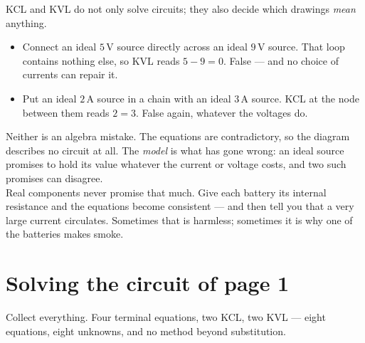 \documentclass[11pt,a4paper]{article}
\newcommand{\uni}[1]{\,\mathrm{#1}}
\newcommand{\A}{\uni{A}}   \newcommand{\V}{\uni{V}}
\begin{document}
\begin{cautionbox}
KCL and KVL do not only solve circuits; they also decide which drawings \emph{mean}
anything.
\begin{itemize}
  \item Connect an ideal $5\V$ source directly across an ideal $9\V$ source. That loop
        contains nothing else, so KVL reads $5 - 9 = 0$. False --- and no choice of
        currents can repair it.
  \item Put an ideal $2\A$ source in a chain with an ideal $3\A$ source. KCL at the node
        between them reads $2 = 3$. False again, whatever the voltages do.
\end{itemize}
Neither is an algebra mistake. The equations are contradictory, so the diagram describes
no circuit at all. The \emph{model} is what has gone wrong: an ideal source promises to
hold its value whatever the current or voltage costs, and two such promises can
disagree.\\[3pt]
Real components never promise that much. Give each battery its internal resistance and the
equations become consistent --- and then tell you that a very large current circulates.
Sometimes that is harmless; sometimes it is why one of the batteries makes smoke.
\end{cautionbox}

\section{Solving the circuit of page 1}

Collect everything. Four terminal equations, two KCL, two KVL --- eight equations, eight
unknowns, and no method beyond substitution.
\end{document}
